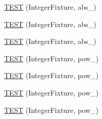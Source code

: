 \begin{DoxyCompactItemize}
\item 
\hyperlink{TestInteger_8c_09_09_a67c6be927a65f050a850d57b8c62ba4e}{T\-E\-S\-T} (Integer\-Fixture, abs\-\_)
\item 
\hyperlink{TestInteger_8c_09_09_a4a84e53aaa6ac60ae0c975f07a3d6d6d}{T\-E\-S\-T} (Integer\-Fixture, abs\-\_)
\item 
\hyperlink{TestInteger_8c_09_09_a9ff96d62c1540bd68cfa98cf5e6f1c44}{T\-E\-S\-T} (Integer\-Fixture, abs\-\_)
\item 
\hyperlink{TestInteger_8c_09_09_ac202bf13a21c16463a79d16f3151009b}{T\-E\-S\-T} (Integer\-Fixture, pow\-\_)
\item 
\hyperlink{TestInteger_8c_09_09_afd294dcefff9809ee26b3f1fb1624a54}{T\-E\-S\-T} (Integer\-Fixture, pow\-\_)
\item 
\hyperlink{TestInteger_8c_09_09_a0950d70a3cb56b8119f1f06bbe47adc8}{T\-E\-S\-T} (Integer\-Fixture, pow\-\_)
\item 
\hyperlink{TestInteger_8c_09_09_a5480a05817d3837abf600a4c0d3859a6}{T\-E\-S\-T} (Integer\-Fixture, pow\-\_)
\end{DoxyCompactItemize}


